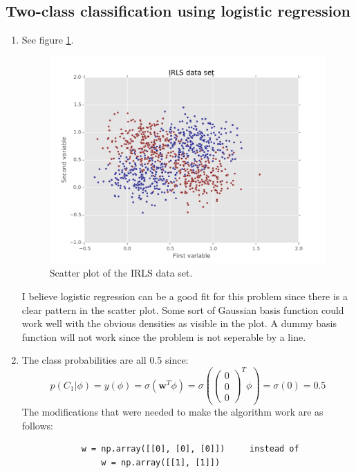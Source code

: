 \documentclass[paper=a4, fontsize=10pt]{scrartcl} %
\numberwithin{equation}{section} %
\numberwithin{figure}{section} %
\numberwithin{table}{section} %
\begin{document}
\subsection{Two-class classification using logistic regression}
\begin{enumerate}
	\item See figure \ref{scatter_iris}.

			\begin{figure}[H]
				\centering
				\includegraphics[scale=0.75]{exercise_221.pdf}
				\caption{Scatter plot of the IRLS data set.}
				\label{scatter_iris}
			\end{figure}
			I believe logistic regression can be a good fit for this problem since there is a clear pattern in the scatter plot. Some sort of Gaussian basis function could work well with the obvious densities as visible in the plot. A dummy basis function will not work since the problem is not seperable by a line.
	\item
		The class probabilities are all 0.5 since:
		\begin{equation}
			p(C_1 \vert \phi) = y(\phi) = \sigma (\boldsymbol w^T \phi) = \sigma (\begin{pmatrix} 0 \\ 0 \\ 0 \end{pmatrix}^T \phi) = \sigma (0) = 0.5
		\end{equation}
		The modifications that were needed to make the algorithm work are as follows:
		\begin{verbatim}
			w = np.array([[0], [0], [0]])     instead of
			    w = np.array([[1], [1]])


\end{verbatim}
\end{enumerate}
\end{document}
